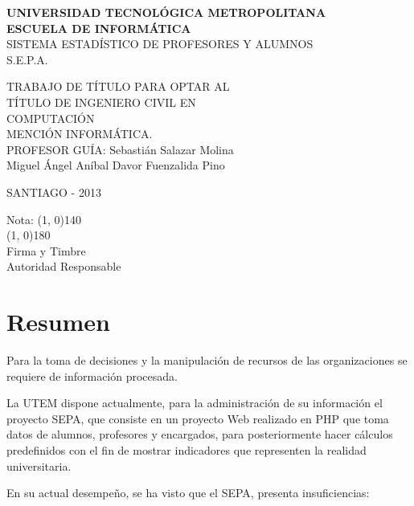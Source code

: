 \documentclass[a4paper,12pt,openany,oneside]{book}
\begin{document}
\thispagestyle{empty}
\begin{center}
\textbf{UNIVERSIDAD TECNOLÓGICA METROPOLITANA\\
ESCUELA DE INFORMÁTICA}\\
\vspace{3cm}
SISTEMA ESTADÍSTICO DE PROFESORES Y ALUMNOS\\S.E.P.A.
\end{center}
\begin{flushright}
TRABAJO DE TÍTULO PARA OPTAR AL\\
TÍTULO DE INGENIERO CIVIL EN\\
COMPUTACIÓN\\
MENCIÓN INFORMÁTICA.\\
\vspace{3cm}
PROFESOR GUÍA: Sebastián Salazar Molina\\
\vspace{1.5cm}
Miguel Ángel Aníbal Davor Fuenzalida Pino
\end{flushright}
\vspace{4cm}
\begin{center}
SANTIAGO - 2013
\end{center}
\newpage
\thispagestyle{empty}
\begin{flushright}
\vspace{20mm}
Nota: \line(1, 0){140} \\
\vspace{30 mm}
\line(1, 0){180}\\	
Firma y Timbre\\
Autoridad Responsable
\end{flushright}
\chapter*{Resumen}
\thispagestyle{empty}
Para la toma de decisiones y la manipulación de recursos de las organizaciones se requiere de información procesada.

La UTEM dispone actualmente, para la administración de su información el proyecto SEPA, que consiste en un proyecto Web realizado en PHP que toma datos de alumnos, profesores y encargados, para posteriormente hacer cálculos predefinidos con el fin de mostrar indicadores que representen la realidad universitaria.

En su actual desempeño, se ha visto que el SEPA, presenta insuficiencias:

\end{document}
